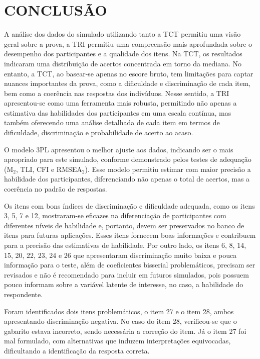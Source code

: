 \chapter{CONCLUSÃO}


A análise dos dados do simulado utilizando tanto a TCT permitiu uma visão geral sobre a prova, a TRI permitiu uma compreensão mais aprofundada sobre o desempenho dos participantes e a qualidade dos itens. Na TCT, os resultados indicaram uma distribuição de acertos concentrada em torno da mediana. No entanto, a TCT, ao basear-se apenas no escore bruto, tem limitações para captar nuances importantes da prova, como a dificuldade e discriminação de cada item, bem como a coerência nas respostas dos indivíduos. Nesse sentido, a TRI apresentou-se como uma ferramenta mais robusta, permitindo não apenas a estimativa das habilidades dos participantes em uma escala contínua, mas também oferecendo uma análise detalhada de cada item em termos de dificuldade, discriminação e probabilidade de acerto ao acaso.

O modelo 3PL apresentou o melhor ajuste aos dados, indicando ser o mais apropriado para este simulado, conforme demonstrado pelos testes de adequação (M$_2$, TLI, CFI e RMSEA$_2$). Esse modelo permitiu estimar com maior precisão a habilidade dos participantes, diferenciando não apenas o total de acertos, mas a coerência no padrão de respostas.

Os itens com bons índices de discriminação e dificuldade adequada, como os itens 3, 5, 7 e 12, mostraram-se eficazes na diferenciação de participantes com diferentes níveis de habilidade e, portanto, devem ser preservados no banco de itens para futuras aplicações. Esses itens fornecem boas informações e contribuem para a precisão das estimativas de habilidade. Por outro lado, os itens 6, 8, 14, 15, 20, 22, 23, 24 e 26 que apresentaram discriminação muito baixa e pouca informação para o teste, além de coeficientes bisserial problemáticos, precisam ser revisados e não é recomendado para incluir em futuros simulados, pois possuem pouco informam sobre a variável latente de interesse, no caso, a habilidade do respondente.

Foram identificados dois itens problemáticos, o item 27 e o item 28, ambos apresentando discriminação negativa. No caso do item 28, verificou-se que o gabarito estava incorreto, sendo necessária a correção do item. Já o item 27 foi mal formulado, com alternativas  que induzem interpretações equivocadas, dificultando a identificação da resposta correta.

